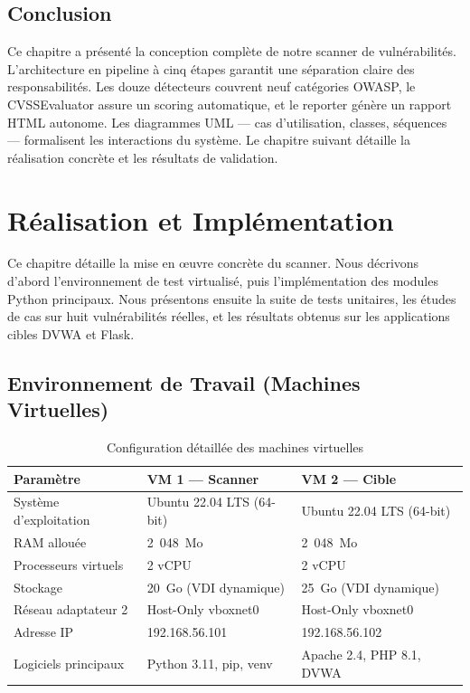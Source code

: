 \documentclass[12pt,a4paper]{report}
\newcommand{\hdr}[1]{\cellcolor{gray!15}\textbf{#1}}
\newcommand{\rowA}{\rowcolor{gray!8}}
\begin{document}
\section{Conclusion}

Ce chapitre a présenté la conception complète de notre scanner de vulnérabilités. L'architecture
en pipeline à cinq étapes garantit une séparation claire des responsabilités. Les douze
détecteurs couvrent neuf catégories OWASP, le CVSSEvaluator assure un scoring automatique,
et le reporter génère un rapport HTML autonome. Les diagrammes UML — cas d'utilisation,
classes, séquences — formalisent les interactions du système. Le chapitre suivant détaille
la réalisation concrète et les résultats de validation.

\chapter{Réalisation et Implémentation}

Ce chapitre détaille la mise en œuvre concrète du scanner. Nous décrivons d'abord
l'environnement de test virtualisé, puis l'implémentation des modules Python principaux.
Nous présentons ensuite la suite de tests unitaires, les études de cas sur huit vulnérabilités
réelles, et les résultats obtenus sur les applications cibles DVWA et Flask.

\section{Environnement de Travail (Machines Virtuelles)}

\begin{table}[h!]
\centering
\caption{Configuration détaillée des machines virtuelles}
\begin{tabular}{p{4cm}p{4.5cm}p{4cm}}
\toprule
\hdr{Paramètre} & \hdr{VM 1 — Scanner} & \hdr{VM 2 — Cible} \\
\midrule
Système d'exploitation & Ubuntu 22.04 LTS (64-bit) & Ubuntu 22.04 LTS (64-bit) \\
\rowA RAM allouée       & 2~048~Mo & 2~048~Mo \\
Processeurs virtuels    & 2 vCPU   & 2 vCPU \\
\rowA Stockage          & 20~Go (VDI dynamique) & 25~Go (VDI dynamique) \\
Réseau adaptateur 2     & Host-Only vboxnet0 & Host-Only vboxnet0 \\
\rowA Adresse IP        & 192.168.56.101 & 192.168.56.102 \\
Logiciels principaux    & Python 3.11, pip, venv & Apache 2.4, PHP 8.1, DVWA \\
\bottomrule
\end{tabular}
\end{table}
\end{document}
